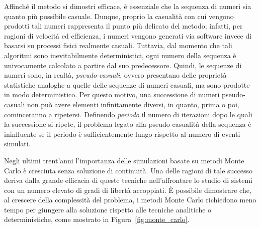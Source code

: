 Affinché il metodo si dimostri efficace, è essenziale che la sequenza di numeri sia quanto più possibile casuale.
Dunque, proprio la casualità con cui vengono prodotti tali numeri rappresenta il punto più delicato del metodo; infatti, per ragioni di velocità ed efficienza, i numeri vengono generati via software invece di basarsi su processi fisici realmente casuali.
Tuttavia, dal momento che tali algoritmi sono inevitabilmente deterministici, ogni numero della sequenza è univocamente calcolato a partire dal suo predecessore. 
Quindi, le sequenze di numeri sono, in realtà, \emph{pseudo-casuali}, ovvero presentano delle proprietà statistiche analoghe a quelle delle sequenze di numeri casuali, ma sono prodotte in modo deterministico. 
Per questo motivo, una successione di numeri pseudo-casuali non può avere elementi infinitamente diversi, in quanto, prima o poi, cominceranno a ripetersi.
Definendo \emph{periodo} il numero di iterazioni dopo le quali la successione si ripete, il problema legato alla pseudo-casualità della sequenza è ininfluente se il periodo è sufficientemente lungo rispetto al numero di eventi simulati.


Negli ultimi trent'anni l'importanza delle simulazioni basate su metodi Monte Carlo è cresciuta senza soluzione di continuità. 
Una delle ragioni di tale successo deriva dalla grande efficacia di queste tecniche nell'affrontare lo studio di sistemi con un numero elevato di gradi di libertà accoppiati. 
È possibile dimostrare che, al crescere della complessità del problema, i metodi Monte Carlo richiedono meno tempo per giungere alla soluzione rispetto alle tecniche analitiche o deterministiche, come mostrato in Figura~\ref{fig:monte_carlo}.


